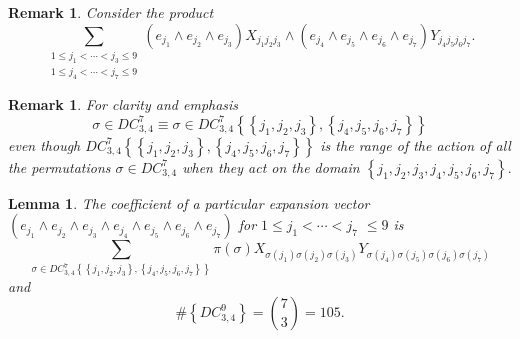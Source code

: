 \documentclass[aps,preprint]{revtex4}%
\newtheorem{lemma}[theorem]{Lemma}
\newtheorem{remark}[theorem]{Remark}
\begin{document}
\begin{remark}
Consider the product
\begin{equation}
\sum_{\substack{1\leq j_{1}<\cdots<j_{3}\leq9\\1\leq j_{4}<\cdots<j_{7}\leq
9}}\left(  e_{j_{1}}\wedge e_{j_{2}}\wedge e_{j_{3}}\right)  X_{j_{1}%
j_{2}j_{3}}\wedge\left(  e_{j_{4}}\wedge e_{j_{5}}\wedge e_{j_{6}}\wedge
e_{j_{7}}\right)  Y_{j_{4}j_{5}j_{6}j_{7}}.
\end{equation}

\end{remark}

\begin{remark}
For clarity and emphasis
\begin{equation}
\sigma\in DC_{3,4}^{7}\equiv\sigma\in DC_{3,4}^{7}\left\{  \left\{
j_{1},j_{2},j_{3}\right\}  ,\left\{  j_{4},j_{5},j_{6},j_{7}\right\}
\right\}
\end{equation}
even though $DC_{3,4}^{7}\left\{  \left\{  j_{1},j_{2},j_{3}\right\}
,\left\{  j_{4},j_{5},j_{6},j_{7}\right\}  \right\}  $ is the \emph{range }of
the action of all the permutations $\sigma\in DC_{3,4}^{7}$ when they act on
the \emph{domain} $\left\{  j_{1},j_{2},j_{3},j_{4},j_{5},j_{6},j_{7}\right\}
.$
\end{remark}

\begin{lemma}
The coefficient of a particular expansion vector $\left(  e_{j_{1}}\wedge
e_{j_{2}}\wedge e_{j_{3}}\wedge e_{j_{4}}\wedge e_{j_{5}}\wedge e_{j_{6}%
}\wedge e_{j_{7}}\right)  $ for $1\leq j_{1}<\cdots<j_{7}$ $\leq9$ is
\begin{equation}
\sum_{\sigma\in DC_{3,4}^{7}\left\{  \left\{  j_{1},j_{2},j_{3}\right\}
,\left\{  j_{4},j_{5},j_{6},j_{7}\right\}  \right\}  }\pi\left(
\sigma\right)  X_{\sigma\left(  j_{1}\right)  \sigma\left(  j_{2}\right)
\sigma\left(  j_{3}\right)  }Y_{\sigma\left(  j_{4}\right)  \sigma\left(
j_{5}\right)  \sigma\left(  j_{6}\right)  \sigma\left(  j_{7}\right)  }%
\end{equation}
and
\begin{equation}
\#\left\{  DC_{3,4}^{9}\right\}  =\binom{7}{3}=105.
\end{equation}

\end{lemma}
\end{document}
